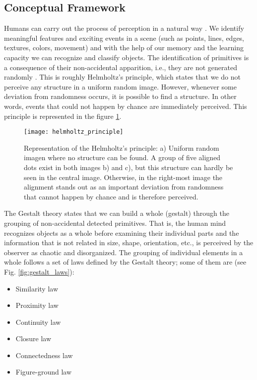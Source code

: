 \subsection{Conceptual Framework}

Humans can carry out the process of perception in a natural way \citep{Petitot:Neurogeometrie:2008}. We identify meaningful features and exciting events in a scene (such as points, lines, edges, textures, colors, movement) and with the help of our memory and the learning capacity we can recognize and classify objects. The  identification of primitives is a consequence of their non-accidental apparition, i.e., they are not generated randomly \citep{Attneave:PR:1954}. This is roughly Helmholtz's principle, which states that we do not perceive any structure in a uniform random image. However, whenever some deviation from randomness occurs, it is possible to find a structure. In other words, events that could not happen by chance are immediately perceived. This principle is represented in the figure \ref{fig:helmholtz_principle}.


\begin{figure}[!ht]
    \centering
    \texttt{[image: helmholtz\_principle]}        
    \caption{Representation of the Helmholtz's principle: a) Uniform random imagen where no structure can be found. A group of five aligned dots exist in both images b) and c), but this structure can hardly be seen in the central image. Otherwise, in the right-most image the alignment stands out as an important deviation from randomness that cannot happen by chance and is therefore perceived.}\label{fig:helmholtz_principle}
\end{figure}


The Gestalt theory \citep{Wertheimer:Psycologische:1923} states that we can build a whole (gestalt) through the grouping of non-accidental detected primitives. That is, the human mind recognizes objects as a whole before examining their individual parts and the information that is not related in size, shape, orientation, etc., is perceived by the observer as chaotic and disorganized. The grouping of individual elements in a whole follows a set of laws defined by the Gestalt theory; some of them are (see Fig. \ref{fig:gestalt_laws}):

\begin{itemize}
	\item Similarity law
	\item Proximity law
	\item Continuity law
	\item Closure law
	\item Connectedness law
	\item Figure-ground law
	
\end{itemize}

